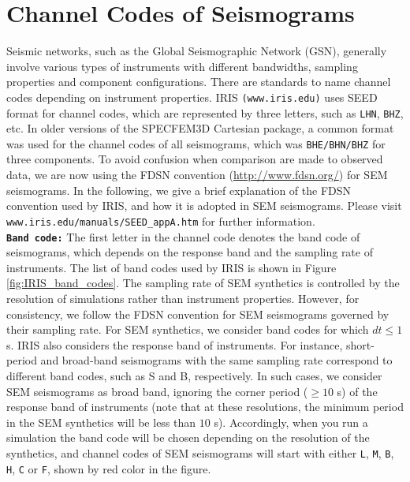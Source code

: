 \chapter{Channel Codes of Seismograms}\label{cha:channel-codes}

Seismic networks, such as the Global Seismographic Network (GSN),
generally involve various types of instruments with different bandwidths,
sampling properties and component configurations. There are standards
to name channel codes depending on instrument properties. IRIS \texttt{(www.iris.edu)}
uses SEED format for channel codes, which are represented by three
letters, such as \texttt{LHN}, \texttt{BHZ}, etc. In older versions
of the SPECFEM3D Cartesian package, a common format was used for the
channel codes of all seismograms, which was \texttt{BHE/BHN/BHZ} for
three components. To avoid confusion when comparison are made to observed
data, we are now using the FDSN convention (\url{http://www.fdsn.org/})
for SEM seismograms. In the following, we give a brief explanation
of the FDSN convention used by IRIS, and how it is adopted in SEM
seismograms. Please visit \texttt{www.iris.edu/manuals/SEED\_appA.htm}
for further information.\\


\noindent \texttt{\textbf{Band code:}} The first letter in the channel
code denotes the band code of seismograms, which depends on the response
band and the sampling rate of instruments. The list of band codes
used by IRIS is shown in Figure \ref{fig:IRIS_band_codes}. The sampling
rate of SEM synthetics is controlled by the resolution of simulations
rather than instrument properties. However, for consistency, we follow
the FDSN convention for SEM seismograms governed by their sampling
rate. For SEM synthetics, we consider band codes for which $dt\leq1$
s. IRIS also considers the response band of instruments. For instance,
short-period and broad-band seismograms with the same sampling rate
correspond to different band codes, such as S and B, respectively.
In such cases, we consider SEM seismograms as broad band, ignoring
the corner period ($\geq10$ s) of the response band of instruments
(note that at these resolutions, the minimum period in the SEM synthetics
will be less than $10$ s). Accordingly, when you run a simulation
the band code will be chosen depending on the resolution of the synthetics,
and channel codes of SEM seismograms will start with either \texttt{L},
\texttt{M}, \texttt{B}, \texttt{H}, \texttt{C} or \texttt{F}, shown
by red color in the figure.\\


